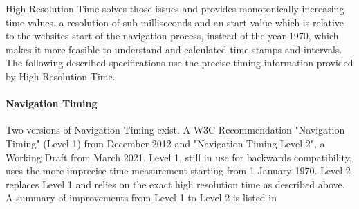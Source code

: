 High Resolution Time solves those issues and provides monotonically increasing time values, a resolution of sub-milliseconds and an start value which is relative to the websites start of the navigation process, instead of the year 1970, which makes it more feasible to understand and calculated time stamps and intervals.
The following described specifications use the precise timing information provided by High Resolution Time.







	










\paragraph{Navigation Timing}



Two versions of Navigation Timing exist.
A W3C Recommendation "Navigation Timing" (Level 1) from December 2012 %
and "Navigation Timing Level 2", a Working Draft from March 2021. %
Level 1, still in use for backwards compatibility, uses the more imprecise time measurement starting from 1 January 1970.
Level 2 replaces Level 1 and relies on the exact high resolution time as described above.
A summary of improvements from Level 1 to Level 2 is listed in %

